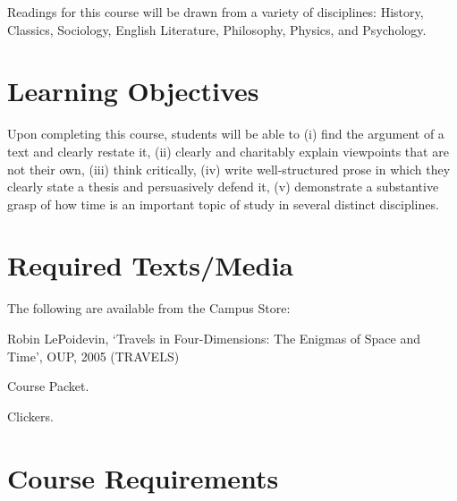 \documentclass[oneside, 11pt]{article}
\begin{document}
Readings for this course will be drawn from a variety of disciplines: History, Classics, Sociology, English Literature, Philosophy, Physics, and Psychology.  



\section*{Learning Objectives}

Upon completing this course, students will be able to (i) find the argument of a text and clearly restate it, (ii) clearly and charitably explain viewpoints that are not their own, (iii) think critically, (iv) write well-structured prose in which they clearly state a thesis and persuasively defend it, (v) demonstrate a substantive grasp of how time is an  important topic of study in several distinct disciplines. 

\section*{Required Texts/Media} The following are available from the Campus Store:
\begin{enumerate*}
\item Robin LePoidevin, `Travels in Four-Dimensions: The Enigmas of Space and Time', OUP, 2005 (TRAVELS)
\item Course Packet.
\item Clickers.
\end{enumerate*}

\section*{Course Requirements}
\end{document}
